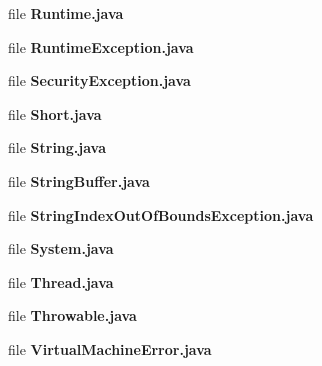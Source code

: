 \begin{DoxyCompactItemize}
\item 
file {\bfseries Runtime.java}
\item 
file {\bfseries RuntimeException.java}
\item 
file {\bfseries SecurityException.java}
\item 
file {\bfseries Short.java}
\item 
file {\bfseries String.java}
\item 
file {\bfseries StringBuffer.java}
\item 
file {\bfseries StringIndexOutOfBoundsException.java}
\item 
file {\bfseries System.java}
\item 
file {\bfseries Thread.java}
\item 
file {\bfseries Throwable.java}
\item 
file {\bfseries VirtualMachineError.java}
\end{DoxyCompactItemize}
